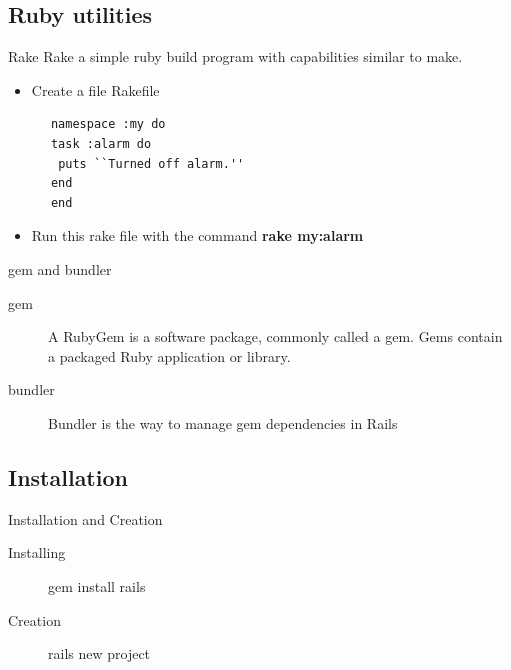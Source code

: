 \documentclass[xcolor=svgnames]{beamer}
\begin{document}
\subsection{Ruby utilities}
\begin{frame}[fragile]{Rake}
\transwipe
    Rake a simple ruby build program with capabilities similar to make.
    \begin{itemize}
      \item Create a file Rakefile \\
    \end{itemize}
    \begin{verbatim}
      namespace :my do
      task :alarm do
       puts ``Turned off alarm.''
      end
      end
      \end{verbatim}
      \begin{itemize}
      	\item Run this rake file with the command \textbf{rake my:alarm}
      \end{itemize}
 	
\end{frame}
\begin{frame}{gem and bundler}
\transwipe
  \begin{description}
    \item[gem]{A RubyGem is a software package, commonly called a gem. Gems contain a packaged Ruby application or library.} \\
    \item[bundler]{Bundler is the way to manage gem dependencies in Rails}
  \end{description}
	
\end{frame}
\subsection{Installation}
\begin{frame}{Installation and Creation}
  \begin{description}
    \item[Installing]{gem install rails}
    \item[Creation]{rails new project}
  \end{description}
\end{frame}
\end{document}
